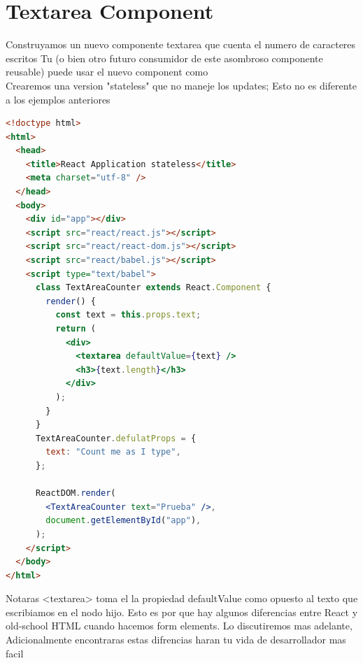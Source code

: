 \section{Textarea Component}
Construyamos un nuevo componente textarea que cuenta el numero de caracteres escritos 
Tu (o bien otro futuro consumidor de este asombroso componente reusable) puede usar el nuevo component como
\\
Crearemos una version "stateless" que no maneje los updates; Esto no es diferente a los ejemplos anteriores
\begin{lstlisting}[language=html]
<!doctype html>
<html>
  <head>
    <title>React Application stateless</title>
    <meta charset="utf-8" />
  </head>
  <body>
    <div id="app"></div>
    <script src="react/react.js"></script>
    <script src="react/react-dom.js"></script>
    <script src="react/babel.js"></script>
    <script type="text/babel">
      class TextAreaCounter extends React.Component {
        render() {
          const text = this.props.text;
          return (
            <div>
              <textarea defaultValue={text} />
              <h3>{text.length}</h3>
            </div>
          );
        }
      }
      TextAreaCounter.defulatProps = {
        text: "Count me as I type",
      };

      ReactDOM.render(
        <TextAreaCounter text="Prueba" />,
        document.getElementById("app"),
      );
    </script>
  </body>
</html>
\end{lstlisting}
Notaras <textarea> toma el la propiedad defaultValue como opuesto al texto que escribiamos en el nodo hijo. Esto es por que hay algunos diferencias entre React y old-school HTML cuando hacemos form elements. Lo discutiremos mas adelante, Adicionalmente encontraras estas difrencias haran tu vida de desarrollador mas facil\\
